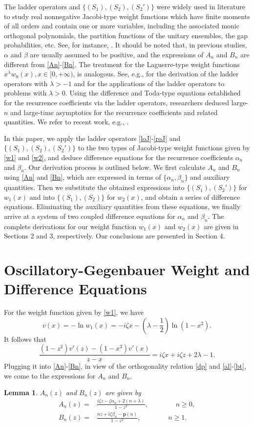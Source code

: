 \documentclass[11pt,a4paper]{article}
\newtheorem{lemma}[theorem]{Lemma}
\numberwithin{equation}{section}
\begin{document}
The ladder operators and $\{(S_1), (S_2), (S_2')\}$ were widely used in literature to study real nonnegative Jacobi-type weight functions which have finite moments of all orders and contain one or more variables, including the associated monic orthogonal polynomials, the partition functions of the unitary ensembles, the gap probabilities, etc. See, for instance, \cite{BCH, CI, MC17, MC20, MC21}. It should be noted that, in previous studies, $\alpha$ and $\beta$ are usually assumed to be positive, and the expressions of $A_n$ and $B_n$ are different from \eqref{An}-\eqref{Bn}. The treatment for the Laguerre-type weight functions $x^{\lambda}w_0(x), x\in[0,+\infty)$, is analogous. See, e.g., \cite{LyuLyu25, MF25} for the derivation of the ladder operators with $\lambda>-1$ and \cite{CI10, CM12, ML25} for the applications of the ladder operators to problems with $\lambda>0$. Using the difference and Toda-type equations established for the recurrence coefficients via the ladder operators, researchers deduced large-$n$ and large-time asymptotics for the recurrence coefficients and related quantities. We refer to recent work, e.g., \cite{CJ21,MF25, MW26-1, MW26-2}.


In this paper, we apply the ladder operators \eqref{loJ}-\eqref{roJ} and $\{(S_1), (S_2), (S_2')\}$ to the two types of Jacobi-type weight functions given by \eqref{w1} and \eqref{w2}, and deduce difference equations for the recurrence coefficients $\alpha_n$ and $\beta_n$.
Our derivation process is outlined below. We first calculate $A_n$ and $B_n$ using \eqref{An} and \eqref{Bn}, which are expressed in terms of $\{\alpha_n,\beta_n\}$ and auxiliary quantities. Then we substitute the obtained expressions into $\{(S_1), (S_2')\}$ for $w_1(x)$ and into $\{(S_1),(S_2)\}$ for $w_2(x)$, and obtain a series of difference equations. Eliminating the auxiliary quantities from these equations, we finally arrive at a system of two coupled difference equations for $\alpha_n$ and $\beta_n$. The complete derivations for our weight function $w_1(x)$ and $w_2(x)$ are given in Sections 2 and 3, respectively. Our conclusions are presented in Section 4.
\section{Oscillatory-Gegenbauer Weight and Difference Equations}
For the weight function given by \eqref{w1}, we have
\[v(x)=-\ln w_1(x)=-i\zeta x-\left(\lambda-\frac{1}{2}\right)\ln (1-x^2).\]
It follows that
\[\frac{(1-z^2)v'(z)-(1-x^2)v'(x)}{z-x}=i\zeta x+i\zeta z+2\lambda-1.\]
Plugging it into \eqref{An}-\eqref{Bn}, in view of the orthogonality relation \eqref{dp} and \eqref{al}-\eqref{bt}, we come to the expressions for $A_n$ and $B_n$.
\begin{lemma}
$A_n(z)$ and $B_n(z)$ are given by
\begin{align}
A_n(z)=&\frac{i\zeta z-\zeta\alpha_n+2(n+\lambda)}{1-z^2},\qquad\qquad n\geq0,\label{An-J}\\
B_n(z)=&\frac{nz+i\zeta\beta_n-\textbf{p}(n)}{1-z^2},\qquad\qquad n\geq1.\label{Bn-J}
\end{align}
\end{lemma}
\end{document}
